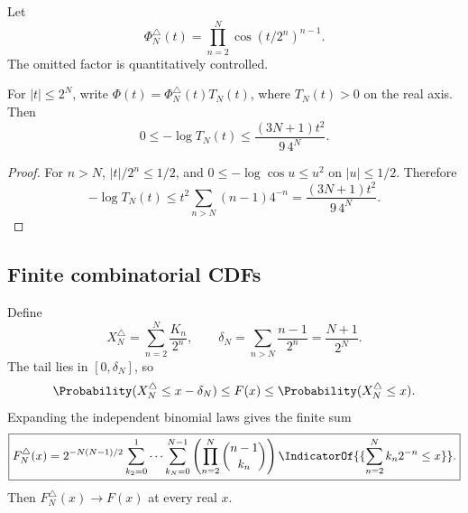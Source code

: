 \documentclass[11pt]{article}
\theoremstyle{definition}
\theoremstyle{remark}
\begin{document}
Let
\begin{equation}
 \Phi_N^\triangle(t)=\prod_{n=2}^{N}
 \cos(t/2^n)^{n-1}.                                     \label{p8:eq:triangular-finite-product}
\end{equation}
The omitted factor is quantitatively controlled.

\begin{proposition}
\label{p8:prop:triangular-tail}
For $|t|\le2^N$, write $\Phi(t)=\Phi_N^\triangle(t)T_N(t)$, where
$T_N(t)>0$ on the real axis.  Then
\begin{equation}
 0\le-\log T_N(t)
 \le \frac{(3N+1)t^2}{9\,4^N}.                           \label{p8:eq:triangular-tail}
\end{equation}
\end{proposition}

\begin{proof}
For $n>N$, $|t|/2^n\le1/2$, and
$0\le-\log\cos u\le u^2$ on $|u|\le1/2$.  Therefore
\[
 -\log T_N(t)
 \le t^2\sum_{n>N}(n-1)4^{-n}
 =\frac{(3N+1)t^2}{9\,4^N}.
\]
\end{proof}

\subsection{Finite combinatorial CDFs}

Define
\begin{equation}
 X_N^\triangle=\sum_{n=2}^{N}\frac{K_n}{2^n},
 \qquad
 \delta_N=\sum_{n>N}\frac{n-1}{2^n}=\frac{N+1}{2^N}.    \label{p8:eq:triangular-truncation}
\end{equation}
The tail lies in $[0,\delta_N]$, so
\begin{equation}
 \Probability(X_N^\triangle\le x-\delta_N)
 \le F(x)\le
 \Probability(X_N^\triangle\le x).                             \label{p8:eq:triangular-cdf-bracket}
\end{equation}
Expanding the independent binomial laws gives the finite sum
\begin{equation}
 \boxed{\displaystyle
 F_N^\triangle(x)=2^{-N(N-1)/2}
 \sum_{k_2=0}^{1}\cdots\sum_{k_N=0}^{N-1}
 \left(\prod_{n=2}^{N}\binom{n-1}{k_n}\right)
 \IndicatorOf{\{\sum_{n=2}^{N}k_n2^{-n}\le x\}}.}     \label{p8:eq:triangular-cdf}
\end{equation}
Then $F_N^\triangle(x)\to F(x)$ at every real $x$.
\end{document}
